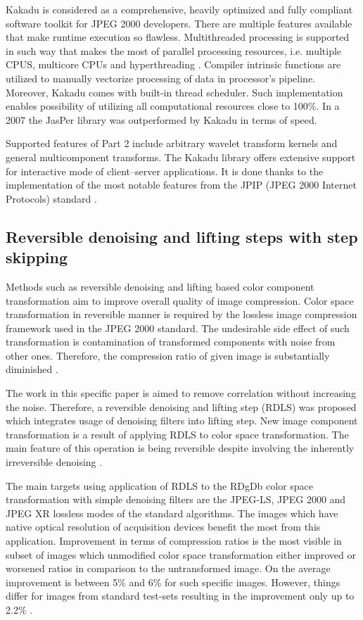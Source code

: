 Kakadu is considered as a comprehensive, heavily optimized and fully compliant software toolkit for JPEG 2000
developers. There are multiple features available that make runtime execution so flawless. Multithreaded
processing is supported in such way that makes the most of parallel processing resources, i.e. multiple CPUS,
multicore CPUs and hyperthreading \cite{jpeg_suite}. Compiler intrinsic functions are utilized to manually
vectorize processing of data in processor's pipeline. Moreover, Kakadu comes with built-in thread scheduler.
Such implementation enables possibility of utilizing all computational resources close to 100\%.
In a 2007 the JasPer library was outperformed by Kakadu in terms of speed.

Supported features of Part 2 include arbitrary wavelet transform kernels and general multicomponent transforms.
The Kakadu library offers extensive support for interactive mode of client–server applications. It is done
thanks to the implementation of the most notable features from the JPIP (JPEG 2000 Internet Protocols) standard \cite{jpeg_suite}.

\subsection{Reversible denoising and lifting steps with step skipping}

Methods such as reversible denoising and lifting based color component transformation aim to improve
overall quality of image compression. Color space transformation in reversible manner is required
by the lossless image compression framework used in the JPEG 2000 standard. The undesirable side effect
of such transformation is contamination of transformed components with noise from other ones.
Therefore, the compression ratio of given image is substantially diminished \cite{denoising}.

The work in this specific paper is aimed to remove correlation without increasing the noise.
Therefore, a reversible denoising and lifting step (RDLS) was proposed which integrates
usage of denoising filters into lifting step. New image component transformation is a result
of applying RDLS to color space transformation. The main feature of this operation is
being reversible despite involving the inherently irreversible denoising \cite{denoising}.

The main targets using application of RDLS to the RDgDb color space transformation with
simple denoising filters are the JPEG-LS, JPEG 2000 and JPEG XR lossless modes of the
standard algorithms.
The images which have native optical resolution of acquisition devices benefit the most
from this application. Improvement in terms of compression ratios is the most visible
in subset of images which unmodified color space transformation either improved or worsened
ratios in comparison to the untransformed image. On the average improvement is between
5\% and 6\% for such specific images. However, things differ for images from standard
test-sets resulting in the improvement only up to 2.2\% \cite{denoising}.

